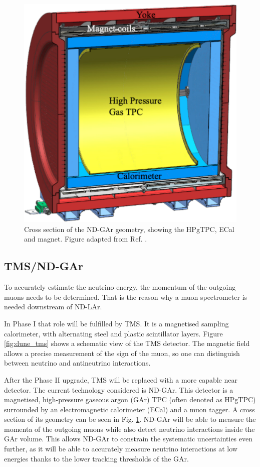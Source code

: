 \begin{figure}[t]
	\centering
	\includegraphics[width=0.45\linewidth]{Images/DUNE/ND/nd_gar}
	\caption[Cross section of the ND-GAr geometry, showing the HPgTPC, ECal and magnet.]{Cross section of the ND-GAr geometry, showing the HPgTPC, ECal and magnet. Figure adapted from Ref. \cite{DUNE2024Phase2}.}
	\label{fig:dune_nd_gar}
\end{figure}

\subsection{TMS/ND-GAr}

To accurately estimate the neutrino energy, the momentum of the outgoing muons needs to be determined. That is the reason why a muon spectrometer is needed downstream of ND-LAr.

In Phase I that role will be fulfilled by TMS. It is a magnetised sampling calorimeter, with alternating steel and plastic scintillator layers. Figure \ref{fig:dune_tms} shows a schematic view of the TMS detector. The magnetic field allows a precise measurement of the sign of the muon, so one can distinguish between neutrino and antineutrino interactions.

After the Phase II upgrade, TMS will be replaced with a more capable near detector. The current technology considered is ND-GAr. This detector is a magnetised, high-pressure gaseous argon (GAr) TPC (often denoted as HPgTPC) surrounded by an electromagnetic calorimeter (ECal) and a muon tagger. A cross section of its geometry can be seen in Fig. \ref{fig:dune_nd_gar}. ND-GAr will be able to measure the momenta of the outgoing muons while also detect neutrino interactions inside the GAr volume. This allows ND-GAr to constrain the systematic uncertainties even further, as it will be able to accurately measure neutrino interactions at low energies thanks to the lower tracking thresholds of the GAr.


